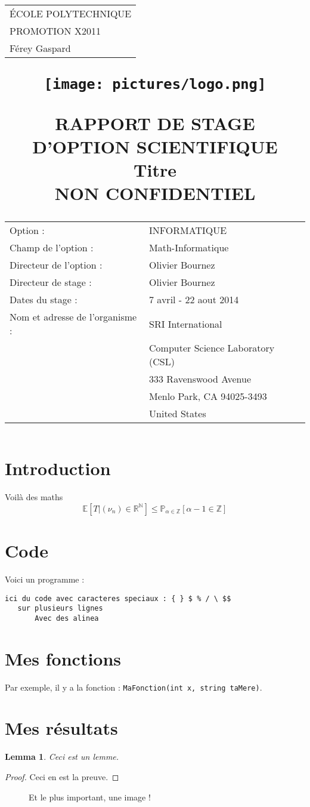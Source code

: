 \documentclass[12pt,a4paper,titlepage]{article}
\title{
\vspace{-3cm}
\normalsize
\begin{tabular}{p{15cm}}
ÉCOLE POLYTECHNIQUE \\
PROMOTION X2011 \\
Férey Gaspard
\end{tabular}
\vspace{3cm}
\begin{center}
\texttt{[image: pictures/logo.png]}
\end{center}
\vspace{1cm}
\large
\begin{center}
RAPPORT DE STAGE D'OPTION SCIENTIFIQUE\\
\vspace{1cm}
{\Huge Titre}\\
\vspace{1cm}
NON CONFIDENTIEL
\end{center}
\vspace{3cm}
\normalsize
\begin{tabular}{p{6cm} p{10cm}}
Option :                  & INFORMATIQUE \\
Champ de l'option :       & Math-Informatique \\
Directeur de l'option :   & Olivier Bournez \\
Directeur de stage :      & Olivier Bournez \\
Dates du stage :          & 7 avril - 22 aout 2014\\
Nom et adresse de l'organisme :  & SRI International \\
                          & Computer Science Laboratory (CSL) \\
                          & 333 Ravenswood Avenue \\
                          & Menlo Park, CA 94025-3493 \\
                          & United States
\end{tabular}
}
\newcommand{\class}[1]{\texttt{#1}}
\newtheorem{lemma}[theorem]{Lemma}
\newcommand{\N}{\mathbb{N}}
\newcommand{\Z}{\mathbb{Z}}
\newcommand{\R}{\mathbb{R}}
\newcommand{\Esp}{\mathbb{E}}
\newcommand{\Prob}{\mathbb{P}}
\begin{document}
\maketitle
\tableofcontents
\newpage

\section*{Introduction}

Voilà des maths
$$ \Esp[T|(\nu_n) \in \R^{\N}] \leq \Prob_{\alpha\in \Z}[\alpha-1 \in \Z]$$

\section{Code}
Voici un programme :
\begin{lstlisting}
ici du code avec caracteres speciaux : { } $ % / \ $$
   sur plusieurs lignes
       Avec des alinea
\end{lstlisting}

\section{Mes fonctions}
Par exemple, il y a la fonction : \class{MaFonction(int x, string taMere)}.

\section{Mes résultats}

\begin{lemma}
Ceci est un lemme.
\end{lemma}
\begin{proof}
Ceci en est la preuve.
\end{proof}

\begin{figure}
   \label{fig:test}
   \centering
   \caption{Et le plus important, une image !}
\end{figure}
\end{document}
